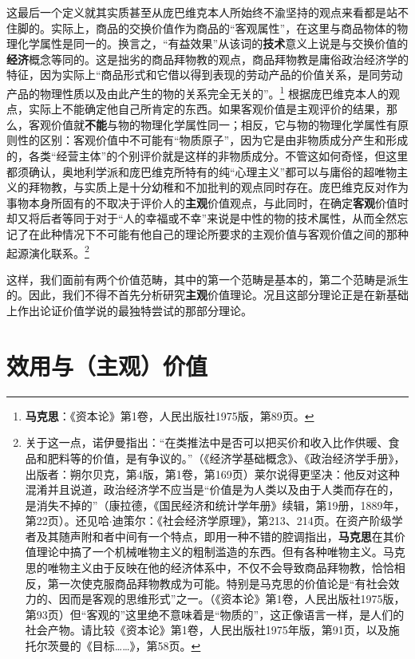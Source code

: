 \documentclass[fontset=fandol, a4paper, 12pt, openright]{ctexbook}
\begin{document}
这最后一个定义就其实质甚至从庞巴维克本人所始终不渝坚持的观点来看都是站不住脚的。实际上，商品的交换价值作为商品的“客观属性”，在这里与商品物体的物理化学属性是同一的。换言之，“有益效果”从该词的\textbf{技术}意义上说是与交换价值的\textbf{经济}概念等同的。这是拙劣的商品拜物教的观点，商品拜物教是庸俗政治经济学的特征，因为实际上“商品形式和它借以得到表现的劳动产品的价值关系，是同劳动产品的物理性质以及由此产生的物的关系完全无关的”。\footnote{\textbf{马克思}：《资本论》第1卷，人民出版社1975版，第89页。} 根据庞巴维克本人的观点，实际上不能确定他自己所肯定的东西。如果客观价值是主观评价的结果，那么，客观价值就\textbf{不能}与物的物理化学属性同一；相反，它与物的物理化学属性有原则性的区别：客观价值中不可能有“物质原子”，因为它是由非物质成分产生和形成的，各类“经营主体”的个别评价就是这样的非物质成分。不管这如何奇怪，但这里都须确认，奥地利学派和庞巴维克所特有的纯“心理主义”都可以与庸俗的超唯物主义的拜物教，与实质上是十分幼稚和不加批判的观点同时存在。庞巴维克反对作为事物本身所固有的不取决于评价人的\textbf{主观}价值观点，与此同时，在确定\textbf{客观}价值时却又将后者等同于对于“人的幸福或不幸”来说是中性的物的技术属性，从而全然忘记了在此种情况下不可能有他自己的理论所要求的主观价值与客观价值之间的那种起源演化联系。\footnote{关于这一点，诺伊曼指出：“在类推法中是否可以把买价和收入比作供暖、食品和肥料等的价值，是有争议的。”（《经济学基础概念》、《政治经济学手册》，出版者：朔尔贝克，第4版，第1卷，第169页）莱尔说得更坚决：他反对这种混淆并且说道，政治经济学不应当是“价值是为人类以及由于人类而存在的，是消失不掉的”（康拉德，《国民经济和统计学年册》续辑，第19册，1889年，第22页）。还见哈$\cdot$迪策尔：《社会经济学原理》，第213、214页。在资产阶级学者及其随声附和者中间有一个特点，即用一种不错的腔调指出，\textbf{马克思}在其价值理论中搞了一个机械唯物主义的粗制滥造的东西。但有各种唯物主义。马克思的唯物主义由于反映在他的经济体系中，不仅不会导致商品拜物教，恰恰相反，第一次使克服商品拜物教成为可能。特别是马克思的价值论是“有社会效力的、因而是客观的思维形式”之一。（《资本论》第1卷，人民出版社1975版，第93页）但“客观的”这里绝不意味着是“物质的”，这正像语言一样，是人们的社会产物。请比较《资本论》第1卷，人民出版社1975年版，第91页，以及施托尔茨曼的《目标……》，第58页。}

这样，我们面前有两个价值范畴，其中的第一个范畴是基本的，第二个范畴是派生的。因此，我们不得不首先分析研究\textbf{主观}价值理论。况且这部分理论正是在新基础上作出论证价值学说的最独特尝试的那部分理论。

\section{效用与（主观）价值}
\end{document}
